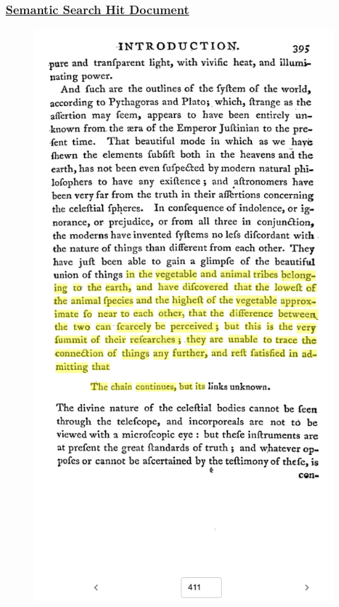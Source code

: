 \documentclass[pdf]{beamer}
\begin{document}
\begin{frame}
  \frametitle{\href{https://gallica-kaiku.rahtiapp.fi/?eccoId=1015500300&offsetStart=715621&offsetEnd=716054}{Semantic Search Hit Document}}
  \begin{figure}
    \centering
    \includegraphics[width=\linewidth,height=\textheight,keepaspectratio]{images/semantic_hit.png}
  \end{figure}

\end{frame}
\end{document}
